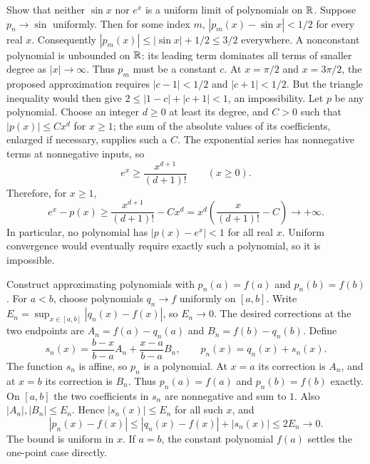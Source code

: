 \goal Show that neither $\sin x$ nor $e^x$ is a uniform limit of polynomials on $\mathbb{R}$.
Suppose $p_n\to\sin$ uniformly. Then for some index $m$,
$|p_m(x)-\sin x|<1/2$ for every real $x$.
Consequently $|p_m(x)|\le|\sin x|+1/2\le3/2$ everywhere.
A nonconstant polynomial is unbounded on $\mathbb{R}$: its leading term dominates
all terms of smaller degree as $|x|\to\infty$. Thus $p_m$ must be a constant $c$.
At $x=\pi/2$ and $x=3\pi/2$, the proposed approximation requires
$|c-1|<1/2$ and $|c+1|<1/2$. But the triangle inequality would then give
$2\le|1-c|+|c+1|<1$, an impossibility.
Let $p$ be any polynomial. Choose an integer $d\ge0$ at least its degree,
and $C>0$ such that $|p(x)|\le Cx^d$ for $x\ge1$; the sum of the absolute
values of its coefficients, enlarged if necessary, supplies such a $C$.
The exponential series has nonnegative terms at nonnegative inputs, so
\[
 e^x\ge\frac{x^{d+1}}{(d+1)!}\qquad(x\ge0).
\]
Therefore, for $x\ge1$,
\[
 e^x-p(x)\ge\frac{x^{d+1}}{(d+1)!}-Cx^d
 =x^d\left(\frac{x}{(d+1)!}-C\right)\longrightarrow+\infty.
\]
In particular, no polynomial has $|p(x)-e^x|<1$ for all real $x$.
Uniform convergence would eventually require exactly such a polynomial, so it is impossible.

\goal Construct approximating polynomials with $p_n(a)=f(a)$ and $p_n(b)=f(b)$.
For $a<b$, choose polynomials $q_n\to f$ uniformly on $[a,b]$.
Write $E_n=\sup_{x\in[a,b]}|q_n(x)-f(x)|$, so $E_n\to0$.
The desired corrections at the two endpoints are
$A_n=f(a)-q_n(a)$ and $B_n=f(b)-q_n(b)$.
Define
\[
 s_n(x)=\frac{b-x}{b-a}A_n+\frac{x-a}{b-a}B_n,
 \qquad p_n(x)=q_n(x)+s_n(x).
\]
The function $s_n$ is affine, so $p_n$ is a polynomial.
At $x=a$ its correction is $A_n$, and at $x=b$ its correction is $B_n$.
Thus $p_n(a)=f(a)$ and $p_n(b)=f(b)$ exactly.
On $[a,b]$ the two coefficients in $s_n$ are nonnegative and sum to $1$.
Also $|A_n|,|B_n|\le E_n$. Hence $|s_n(x)|\le E_n$ for all such $x$, and
\[
 |p_n(x)-f(x)|\le|q_n(x)-f(x)|+|s_n(x)|\le2E_n\longrightarrow0.
\]
The bound is uniform in $x$. If $a=b$, the constant polynomial $f(a)$
settles the one-point case directly.

